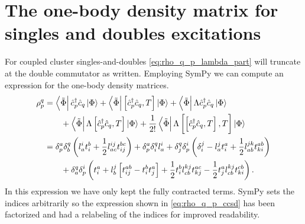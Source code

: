     \section{The one-body density matrix for singles and doubles excitations}
        For coupled cluster singles-and-doubles \autoref{eq:rho_q_p_lambda_part}
        will truncate at the double commutator as written. Employing
        SymPy\cite{sympy} we can compute an expression for the one-body density
        matrices.
        \begin{align}
            \rho^{q}_{p}
            &= \bra{\tilde{\Phi}}\hat{c}_{p}^{\dagger}\hat{c}_{q}\ket{\Phi}
            + \bra{\tilde{\Phi}}\left[\hat{c}_{p}^{\dagger}\hat{c}_{q}, T\right]\ket{\Phi}
            + \bra{\tilde{\Phi}}\Lambda \hat{c}_{p}^{\dagger}\hat{c}_{q}\ket{\Phi}
            \nonumber \\
            &\qquad
            + \bra{\tilde{\Phi}}\Lambda \left[\hat{c}_{p}^{\dagger}\hat{c}_{q}, T\right]\ket{\Phi}
            + \frac{1}{2!}
            \bra{\tilde{\Phi}}\Lambda \left[\left[\hat{c}_{p}^{\dagger}\hat{c}_{q}, T\right], T\right]\ket{\Phi}
            \\
            &=
            \delta^a_p \delta^q_b \left( 
                l^i_a t^b_i + \frac{1}{2} l^{ij}_{ac} t^{bc}_{ij}
             \right)
            + \delta^a_p \delta^q_i l^i_a
            + \delta^q_j \delta^i_p \left( 
                \delta^j_i
                - l^j_a t^a_i
                + \frac{1}{2} l^{jk}_{ab} t^{ab}_{ki}
             \right)
            \nonumber \\
            &\qquad
            + \delta^q_a \delta^i_p \left( 
                t^a_i
                + l^j_b \left[ 
                    t^{ab}_{ij} - t^b_i t^a_j
                 \right]
                + \frac{1}{2} t^{b}_{i} l^{kj}_{cb} t^{ac}_{kj}
                - \frac{1}{2} t^{a}_{j} l^{kj}_{cb} t^{cb}_{ki}
             \right).
            \label{eq:rho_q_p_ccsd}
        \end{align}
        In this expression we have only kept the fully contracted terms. SymPy
        sets the indices arbitrarily so the expression shown in
        \autoref{eq:rho_q_p_ccsd} has been factorized and had a relabeling of
        the indices for improved readability.
